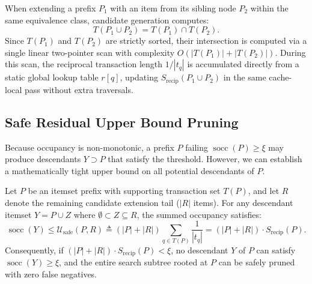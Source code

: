 \documentclass[runningheads,orivec]{llncs}
\newcommand{\socc}{\operatorname{socc}}
\begin{document}
When extending a prefix $P_1$ with an item from its sibling node $P_2$ within the same equivalence class, candidate generation computes:
\begin{equation}
T(P_1 \cup P_2) = T(P_1) \cap T(P_2).
\end{equation}
Since $T(P_1)$ and $T(P_2)$ are strictly sorted, their intersection is computed via a single linear two-pointer scan with complexity $O(|T(P_1)| + |T(P_2)|)$. During this scan, the reciprocal transaction length $1/|t_q|$ is accumulated directly from a static global lookup table $r[q]$, updating $S_{\mathrm{recip}}(P_1 \cup P_2)$ in the same cache-local pass without extra traversals.

\subsection{Safe Residual Upper Bound Pruning}

Because occupancy is non-monotonic, a prefix $P$ failing $\socc(P) \ge \xi$ may produce descendants $Y \supset P$ that satisfy the threshold. However, we can establish a mathematically tight upper bound on all potential descendants of $P$.

\begin{theorem}
\label{thm:safe_bound}
Let $P$ be an itemset prefix with supporting transaction set $T(P)$, and let $R$ denote the remaining candidate extension tail ($|R|$ items). For any descendant itemset $Y = P \cup Z$ where $\emptyset \subset Z \subseteq R$, the summed occupancy satisfies:
\begin{equation}
\socc(Y) \le \mathcal{U}_{\mathrm{safe}}(P, R) \triangleq (|P| + |R|) \sum_{q \in T(P)} \frac{1}{|t_q|} = (|P| + |R|) \cdot S_{\mathrm{recip}}(P).
\end{equation}
Consequently, if $(|P| + |R|) \cdot S_{\mathrm{recip}}(P) < \xi$, no descendant $Y$ of $P$ can satisfy $\socc(Y) \ge \xi$, and the entire search subtree rooted at $P$ can be safely pruned with zero false negatives.
\end{theorem}
\end{document}
